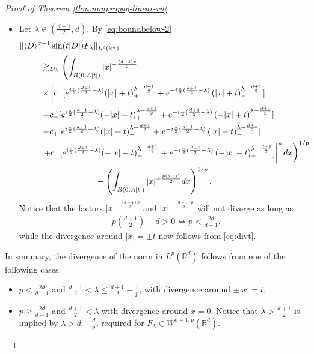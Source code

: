 \documentclass[a4paper, reqno, 11pt]{amsart}
\theoremstyle{definition}
\begin{document}
\begin{proof}[Proof of Theorem \ref{thm:nonpropag-linear-rn}]
\begin{itemize}
\item Let $\lambda \in (\frac{d-1}{2},d)$. By \eqref{eq:boundbelow-2}
\begin{align}\label{eq:gralint-p-2}
\| &\langle D \rangle^{\sigma-1} \sin(t|D|) F_{\lambda} \|_{L^p(\mathbb{R}^d)} \nonumber \\
&\qquad \gtrsim_{D_{\lambda}} \left( \int_{B(0,A|t|)} |x|^{-\frac{(d-1)p}{2}}\nonumber \right. \\
& \qquad \times \left| c_+ [ e^{i\frac{\pi}{2}(\frac{d+1}{2} - \lambda)} (|x| + t)_+^{\lambda-\frac{d+1}{2}} + e^{-i\frac{\pi}{2}(\frac{d+1}{2} - \lambda)} \left(|x| + t\right)_-^{\lambda-\frac{d+1}{2}}] \nonumber \right. \\
& \qquad \left. + c_-  [ e^{i\frac{\pi}{2}(\frac{d+1}{2} - \lambda)}(-|x| + t)_+^{\lambda-\frac{d+1}{2}} + e^{-i\frac{\pi}{2}(\frac{d+1}{2} - \lambda)} \left(-|x| + t\right)_-^{\lambda-\frac{d+1}{2}} ]\right. \nonumber \\
& \qquad \left. + c_+ [ e^{i\frac{\pi}{2}(\frac{d+1}{2} - \lambda)} (|x| - t)_+^{\lambda-\frac{d+1}{2}} + e^{-i\frac{\pi}{2}(\frac{d+1}{2} - \lambda)} \left( |x| - t \right)_-^{\lambda-\frac{d+1}{2}}] \nonumber \right. \\
&\qquad  \left. \left. + c_-  [ e^{i\frac{\pi}{2}(\frac{d+1}{2} - \lambda)}(-|x| - t)_+^{\lambda-\frac{d+1}{2}} + e^{-i\frac{\pi}{2}(\frac{d+1}{2} - \lambda)} \left(-|x| - t\right)_-^{\lambda-\frac{d+1}{2}} ] \right|^p  dx \right)^{1/p} \nonumber \\
&\hspace{30mm} - \left(\int_{B(0,A|t|)} |x|^{-\frac{p(d+1)}{2}} dx\right)^{1/p}.
\end{align}
Notice that the factors $|x|^{-\frac{(d+1)p}{2}}$ and $|x|^{-\frac{(d-1)p}{2}}$ will not diverge as long as
\begin{align*}
-p\left(\frac{d+1}{2} \right) + d > 0 \Longleftrightarrow p < \frac{2d}{d+1},
\end{align*}
while the divergence around $|x| = \pm t$ now follows from \eqref{eq:divt}. 
\end{itemize}
In summary, the divergence of the norm in $L^p(\mathbb{R}^d)$ follows from one of the following cases:
\begin{itemize}
\item $p < \frac{2d}{d+1}$ and $\frac{d-1}{2} < \lambda \leq \frac{d+1}{2} - \frac{1}{p}$, with divergence around $\pm |x| = t$, 
\item $p \geq \frac{2d}{d-1}$ and $\frac{d+1}{2} < \lambda$ with divergence around $x = 0$. Notice that  $\lambda > \frac{d+1}{2}$ is implied by $\lambda > d - \frac{d}{p}$, required for $F_{\lambda} \in W^{\sigma-1,p}(\mathbb{R}^d)$.
\end{itemize}
\end{proof}
\end{document}
